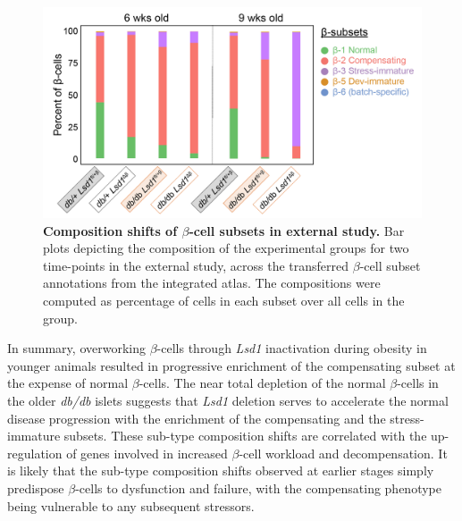 \begin{figure}[t]
    \centering
    \includegraphics[width=\linewidth]{Chapter5/Fig/F3-17-03.png}
    \caption[Composition shifts of $\beta$-cell subsets in external study]{\textbf{Composition shifts of $\beta$-cell subsets in external study.} Bar plots depicting the composition of the experimental groups for two time-points in the external study, across the transferred $\beta$-cell subset annotations from the integrated atlas. The compositions were computed as percentage of cells in each subset over all cells in the group.}
    \label{fig:chp3_valid_study_composition}
\end{figure}

In summary, overworking $\beta$-cells through \textit{Lsd1} inactivation during obesity in younger animals resulted in progressive enrichment of the compensating subset at the expense of normal $\beta$-cells. The near total depletion of the normal $\beta$-cells in the older \textit{db/db} islets suggests that \textit{Lsd1} deletion serves to accelerate the normal disease progression with the enrichment of the compensating and the stress-immature subsets. These sub-type composition shifts are correlated with the up-regulation of genes involved in increased $\beta$-cell workload and decompensation. It is likely that the sub-type composition shifts observed at earlier stages simply predispose $\beta$-cells to dysfunction and failure, with the compensating phenotype being vulnerable to any subsequent stressors.


